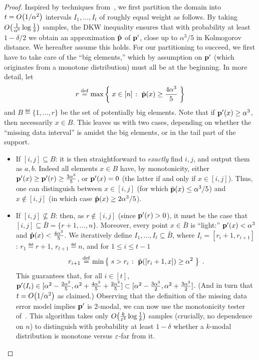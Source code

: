 \begin{proof}
    Inspired by techniques from~\cite{DDS:12},
  we first partition the domain into $t=\bigO{1/\alpha^2}$ intervals 
  $I_1,\dots, I_t$ of roughly equal weight as follows. By taking $\bigO{\frac{1}{\alpha^6}\log\frac{1}{\delta}}$ samples, the DKW inequality ensures that with probability at least $1-\delta/2$ we obtain an approximation $\hat{\mathbf{p}}$ of $\mathbf{p}^\prime$, close up to $\alpha^3/5$ in Kolmogorov distance. We hereafter assume this holds. For our partitioning to succeed, we first have to take care of the ``big elements,'' which by assumption on $\mathbf{p}^\prime$ (which originates from a monotone distribution) must all be at the beginning. In more detail, let 
  \[
    r \stackrel{\rm def}{=} \max\left\{\;  x\in [n]  \;\colon\;  \hat{\mathbf{p}}(x) \geq \frac{4\alpha^3}{5} \; \right\}
  \]
  and $B\eqdef\{1,\dots,r\}$ be the set of potentially big elements. Note that if $\mathbf{p}^\prime(x) \geq \alpha^3$, then necessarily $x\in B$. This leaves us with two cases, depending on whether the ``missing data interval'' is amidst the big elements, or in the tail part of the support.  
  \begin{itemize}
    \item If $[i,j] \subseteq B$: it is then straightforward to \emph{exactly} find $i,j$, and output them as $a,b$. Indeed all elements $x\in B$ have, by monotonicity, either $\mathbf{p}^\prime(x) \geq \mathbf{p}^\prime(r) \geq \frac{3\alpha^3}{5}$, or $\mathbf{p}^\prime(x)=0$ (the latter if and only if $x\in[i,j]$). Thus, one can distinguish between $x\in[i,j]$ (for which $\hat{\mathbf{p}}(x) \leq \alpha^3/5$) and $x\notin[i,j]$ (in which case $\hat{\mathbf{p}}(x) \geq 2\alpha^3/5$).
    \item If $[i,j] \not\subseteq B$: then, as $r\notin [i,j]$ (since $\mathbf{p}^\prime(r) > 0$), it must be the case that $[i,j] \subseteq \bar{B}=\{r+1,\dots, n\}$. Moreover, every point $x\in \bar{B}$ is ``light:'' $\mathbf{p}^\prime(x) < \alpha^3$ and $\hat{\mathbf{p}}(x) < \frac{4\alpha^3}{5}$.     We iteratively define $I_1,\dots, I_t\subseteq \bar{B}$, where $I_i=[r_i+1,r_{i+1}]$: $r_1\eqdef r+1$, $r_{t+1}\eqdef n$, and for $1 \leq i \leq t-1$
    \[
        r_{i+1} \stackrel{\rm def}{=} \min\left\{\;  s > r_i  \;\colon\;  \hat{\mathbf{p}}([r_i+1,x]) \geq \alpha^2 \; \right\}\;.
    \]
    This guarantees that, for all $i\in[t]$, $\mathbf{p}^\prime( I_i ) \in [\alpha^2-\frac{2\alpha^3}{5}, \alpha^2+\frac{4\alpha^3}{5}+\frac{2\alpha^3}{5}]\subset[\alpha^2-\frac{3\alpha^3}{2},\alpha^2+\frac{3\alpha^3}{2}]$. (And in turn that $t=\bigO{1/\alpha^2}$ as claimed.)
  Observing that the definition of the missing data error model implies 
  $\mathbf{p}^\prime$ is 2-modal, we can now use the monotonicity tester of~\cite[Section 3.4]{DDS:12}. This algorithm takes 
  only {$\bigO{\frac{k}{\eps^2}\log\frac{1}{\delta}}$} samples 
  (crucially, no dependence on $n$) to distinguish with probability at least $1-\delta$ whether
  a $k$-modal distribution is monotone versus $\varepsilon$-far from it.


\end{itemize}
\end{proof}
